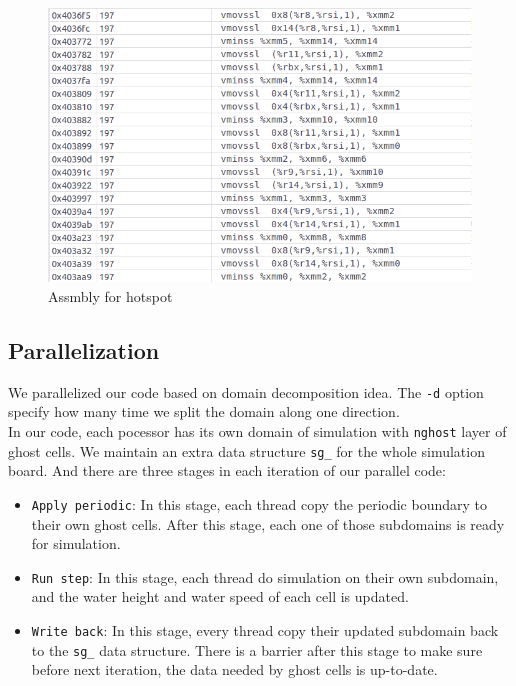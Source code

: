 \documentclass[11pt]{article}
\begin{document}
        \begin{figure}[H]
            \centering
            \includegraphics[width=4.5in]{assmbly.png}
            \caption{Assmbly for hotspot}
        \end{figure}

        \clearpage
        
    
        
        \subsection{Parallelization}
        We parallelized our code based on domain decomposition idea. The \texttt{-d} option specify how many time we split the domain along one direction. \\

        In our code, each pocessor has its own domain of simulation with \texttt{nghost} layer of ghost cells. We maintain an extra data structure \texttt{sg\_} for the whole simulation board. And there are three stages in each iteration of our parallel code:
        \begin{itemize}
            \item \texttt{Apply periodic}: In this stage, each thread copy the periodic boundary to their own ghost cells. After this stage, each one of those subdomains is ready for simulation.
            \item \texttt{Run step}: In this stage, each thread do simulation on their own subdomain, and the water height and water speed of each cell is updated.
            \item \texttt{Write back}: In this stage, every thread copy their updated subdomain back to the \texttt{sg\_} data structure. There is a barrier after this stage to make sure before next iteration, the data needed by ghost cells is up-to-date.
        \end{itemize}
\end{document}
